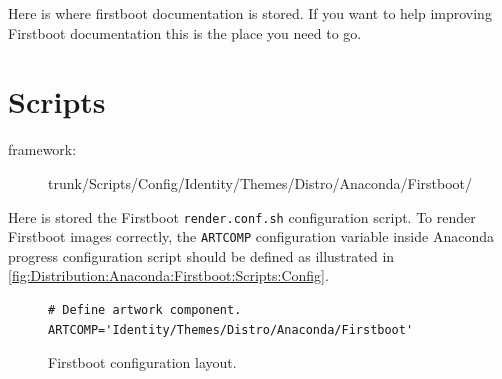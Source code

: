 \noindent Here is where firstboot documentation is stored.  If you
want to help improving Firstboot documentation this is the place you
need to go.

\section{Scripts}
\hypertarget{sec:Distribution:Anaconda:Firstboot:Scripts}{}

\begin{description}
\item[framework:] trunk/Scripts/Config/Identity/Themes/Distro/Anaconda/Firstboot/
\end{description}

\noindent Here is stored the Firstboot \texttt{render.conf.sh}
configuration script.  To render Firstboot images correctly, the
\texttt{ARTCOMP} configuration variable inside Anaconda progress
configuration script should be defined as illustrated in
\autoref{fig:Distribution:Anaconda:Firstboot:Scripts:Config}. 

\begin{figure}
\hrulefill
\begin{verbatim}
# Define artwork component.
ARTCOMP='Identity/Themes/Distro/Anaconda/Firstboot'
\end{verbatim}
\hrulefill
\caption{Firstboot configuration layout.%
   \label{fig:Distribution:Anaconda:Firstboot:Scripts:Config}}
\end{figure}

